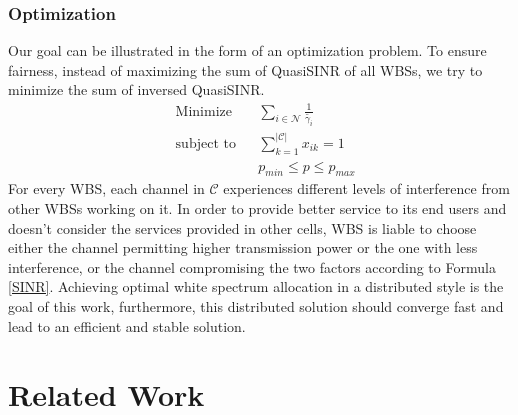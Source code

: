\subsubsection*{Optimization}
Our goal can be illustrated in the form of an optimization problem.
To ensure fairness, instead of maximizing the sum of QuasiSINR of all WBSs, we try to minimize the sum of inversed QuasiSINR. 
	\begin{equation}
\label{problem}
			\begin{aligned}
			& {\text{Minimize}}
			& & \sum_{i\in \mathcal{N}}\frac{1}{\tilde{\gamma_{i}}} \\
			& \text{subject to}
			& & \sum_{k=1}^{|\mathcal{C}|}x_{ik}=1 \\
			& & & p_{min} \leq p \leq p_{max}
			\end{aligned}
		\end{equation}
For every WBS, each channel in $\mathcal{C}$ experiences different levels of interference from other WBSs working on it.
In order to provide better service to its end users and doesn't consider the services provided in other cells, WBS is liable to choose either the channel permitting higher transmission power or the one with less interference, or the channel compromising the two factors according to Formula \ref{SINR}.
 Achieving optimal white spectrum allocation in a distributed style is the goal of this work, furthermore, this distributed solution should converge fast and lead to an efficient and stable solution.


\section{Related Work}
\label{relatedWork}


